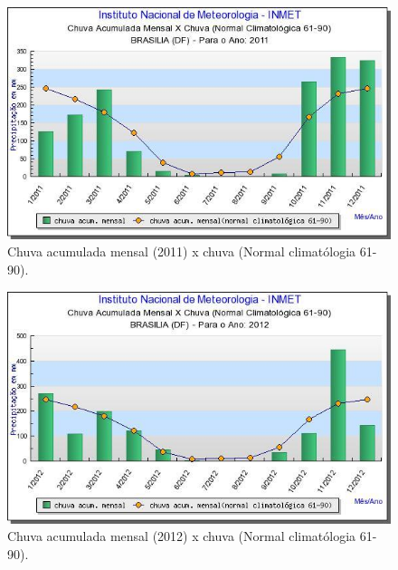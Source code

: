 \begin{figure}[H]
	 \centering
	\label{Chuva acumulada mensal (2011) x chuva (Normal climatólogia 61-90)}
	 \includegraphics[scale=0.6]{captacao/1.jpg}
	 \caption{Chuva acumulada mensal (2011) x chuva (Normal climatólogia 61-90)\cite{INMET}.}
\end{figure}
 
 
\begin{figure}[H]
	 \centering
	\label{Chuva acumulada mensal (2012) x chuva (Normal climatólogia 61-90)}
	 \includegraphics[scale=0.6]{captacao/2.jpg}
	 \caption{Chuva acumulada mensal (2012) x chuva (Normal climatólogia 61-90)\cite{INMET}.}
\end{figure}

